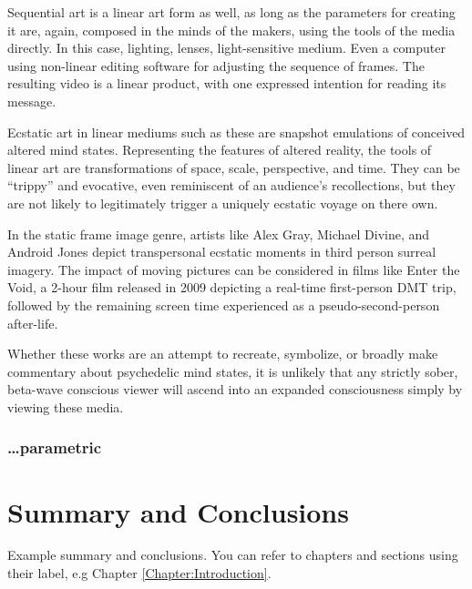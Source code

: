 \documentclass{UIdahoMastersThesis}
\begin{document}
Sequential art is a linear art form as well, as long as the parameters for creating it are, again, composed in the minds of the makers, using the tools of the media directly. In this case, lighting, lenses, light-sensitive medium. Even a computer using non-linear editing software for adjusting the sequence of frames. The resulting video is a linear product, with one expressed intention for reading its message.

Ecstatic art in linear mediums such as these are snapshot emulations of conceived altered mind states. Representing the features of altered reality, the tools of linear art are transformations of space, scale, perspective, and time. They can be ``trippy'' and evocative, even reminiscent of an audience's recollections, but they are not likely to legitimately trigger a uniquely ecstatic voyage on there own.  

In the static frame image genre, artists like Alex Gray, Michael Divine, and Android Jones depict transpersonal ecstatic moments in third person surreal imagery. The impact of moving pictures can be considered in films like Enter the Void, a 2-hour film released in 2009 depicting a real-time first-person DMT trip, followed by the remaining screen time experienced as a pseudo-second-person after-life.

Whether these works are an attempt to recreate, symbolize, or broadly make commentary about psychedelic mind states, it is unlikely that any strictly sober, beta-wave conscious viewer will ascend into an expanded consciousness simply by viewing these media.

\subsection*{\ldots parametric}

\chapter{Summary and Conclusions}
\label{Chapter:SummaryAndConclusions}

Example summary and conclusions. You can refer to chapters and sections using their label, e.g Chapter \ref{Chapter:Introduction}.




\end{document}
